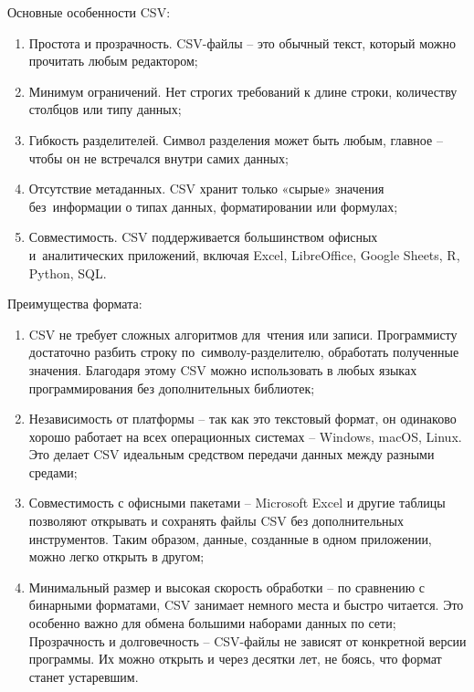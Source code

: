 \documentclass{ou}
\begin{document}
Основные особенности CSV:
\begin{enumerate}[leftmargin=0em, itemindent=3.75em, nosep, label=\arabic*)]
\item Простота и прозрачность. CSV-файлы -- это обычный текст, который можно прочитать любым редактором;
\item Минимум ограничений. Нет строгих требований к длине строки, количеству столбцов или типу данных;
\item Гибкость разделителей. Символ разделения может быть любым, главное -- чтобы он не встречался внутри самих данных;
\item Отсутствие метаданных. CSV хранит только «сырые» значения без~информации о типах данных, форматировании или формулах;
\item Совместимость. CSV поддерживается большинством офисных и~аналитических приложений, включая Excel, LibreOffice, Google Sheets, R, Python, SQL.
\end{enumerate}

Преимущества формата:
\begin{enumerate}[leftmargin=0em, itemindent=3.75em, nosep, label=\arabic*)]
\item CSV не требует сложных алгоритмов для~чтения или записи. Программисту достаточно разбить строку по~символу-разделителю, обработать полученные значения. Благодаря этому CSV можно использовать в любых языках программирования без дополнительных библиотек;
\item Независимость от платформы -- так как это текстовый формат, он одинаково хорошо работает на всех операционных системах -- Windows, macOS, Linux. Это делает CSV идеальным средством передачи данных между разными средами;
\item Совместимость с офисными пакетами -- Microsoft Excel и другие таблицы позволяют открывать и сохранять файлы CSV без дополнительных инструментов. Таким образом, данные, созданные в одном приложении, можно легко открыть в другом;
\item Минимальный размер и высокая скорость обработки -- по сравнению с бинарными форматами, CSV занимает немного места и быстро читается. Это особенно важно для обмена большими наборами данных по сети;
Прозрачность и долговечность -- CSV-файлы не зависят от конкретной версии программы. Их можно открыть и через десятки лет, не боясь, что формат станет устаревшим.
\end{enumerate}
\end{document}
